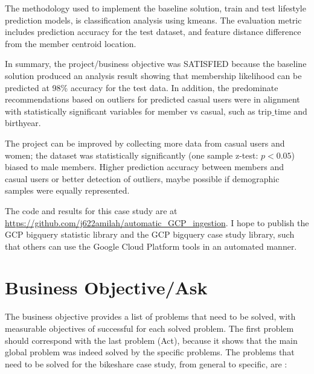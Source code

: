\documentclass[11pt, onecolumn]{article}
\begin{document}
The methodology used to implement the baseline solution, train and test lifestyle prediction models, is classification analysis using kmeans. The evaluation metric includes prediction accuracy for the test dataset, and feature distance difference from the member centroid location.

In summary, the project/business objective was SATISFIED because the baseline solution produced an analysis result showing that membership likelihood can be predicted at 98\% accuracy for the test data. In addition, the predominate recommendations based on outliers for predicted casual users were in alignment with statistically significant variables for member vs casual, such as trip$\_$time and birthyear.  

The project can be improved by collecting more data from casual users and women; the dataset was statistically significantly (one sample z-test: $p < 0.05$) biased to male members. Higher prediction accuracy between members and casual users or better detection of outliers, maybe possible if demographic samples were equally represented.

The code and results for this case study are at \url{https://github.com/j622amilah/automatic_GCP_ingestion}. I hope to publish the GCP bigquery statistic library and the GCP bigquery case study library, such that others can use the Google Cloud Platform tools in an automated  manner.


\section{Business Objective/Ask}

The business objective provides a list of problems that need to be solved, with measurable objectives of successful for each solved problem. The first problem should correspond with the last problem (Act), because it shows that the main global problem was indeed solved by the specific problems. The problems that need to be solved for the bikeshare case study, from general to specific, are : 
\end{document}
